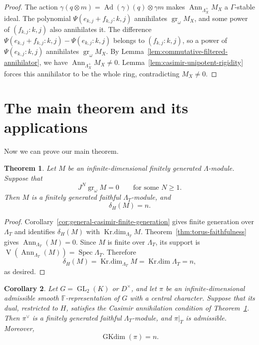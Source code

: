 \documentclass[11pt]{article}
\numberwithin{equation}{section}
\newtheorem{theorem}{Theorem}[section]
\newtheorem{corollary}[theorem]{Corollary}
\theoremstyle{definition}
\theoremstyle{remark}
\newcommand{\F}{\mathbb F}
\DeclareMathOperator{\GL}{GL}
\DeclareMathOperator{\gr}{gr}
\DeclareMathOperator{\Ann}{Ann}
\DeclareMathOperator{\Spec}{Spec}
\DeclareMathOperator{\GKdim}{GKdim}
\DeclareMathOperator{\Krdim}{Kr.dim}
\begin{document}
\begin{proof}
The action
$\gamma(q\otimes m)=\operatorname{Ad}(\gamma)(q)\otimes\gamma m$
makes $\Ann_{\Lambda_X^{+}}M_X$ a $\Gamma$-stable ideal.
The polynomial $\Psi(e_{k,j}+f_{k,j}:k,j)$ annihilates
$\gr_\omega M_X$, and some power of $(f_{k,j}:k,j)$ also annihilates it.
The difference
$\Psi(e_{k,j}+f_{k,j}:k,j)-\Psi(e_{k,j}:k,j)$
belongs to $(f_{k,j}:k,j)$, so a power of
$\Psi(e_{k,j}:k,j)$ annihilates $\gr_\omega M_X$. 
By Lemma~\ref{lem:commutative-filtered-annihilator}, we have 
$\Ann_{\Lambda_X^{+}}M_X\ne0$. Lemma~\ref{lem:casimir-unipotent-rigidity} forces
this annihilator to be the whole ring, contradicting $M_X\ne0$.
\end{proof}

\section{The main theorem and its applications}\label{sec:conclusion}

Now we can prove our main theorem.

\begin{theorem}\label{thm:main-lambda}
Let $M$ be an infinite-dimensional finitely generated
$\Lambda$-module. Suppose that
\[
 J^N\gr_\omega M=0
 \qquad\text{for some }N\geq1.
\]
Then $M$ is a finitely generated faithful $\Lambda_T$-module, and
\[
 \delta_H(M)=n.
\]
\end{theorem}

\begin{proof}
Corollary~\ref{cor:general-casimir-finite-generation} gives finite
generation over $\Lambda_T$ and identifies $\delta_H(M)$ with
$\Krdim_{\Lambda_T} M$. Theorem~\ref{thm:torus-faithfulness} gives
$\Ann_{\Lambda_T}(M)=0$. Since $M$ is finite over $\Lambda_T$, its support is
$\operatorname{V}(\Ann_{\Lambda_T}(M))=\Spec \Lambda_T$. Therefore
\[
 \delta_H(M)=\Krdim_{\Lambda_T} M=\Krdim \Lambda_T=n,
\]
as desired. 
\end{proof}

\begin{corollary}\label{cor:main-gk-dimension}
Let $G=\GL_2(K)$ or $D^\times$, and let $\pi$ be an
infinite-dimensional admissible smooth $\F$-representation of
$G$ with a central character. Suppose that its dual, restricted
to $H$, satisfies the Casimir annihilation condition of
Theorem~\ref{thm:main-lambda}. Then $\pi^\vee$ is a finitely
generated faithful $\Lambda_T$-module, and $\pi|_T$ is admissible.
Moreover,
\[
 \GKdim(\pi)=n.
\]
\end{corollary}
\end{document}
